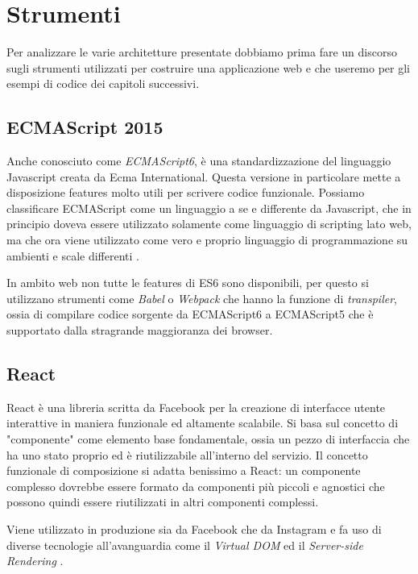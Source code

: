 \chapter{Strumenti}
Per analizzare le varie architetture presentate dobbiamo prima fare un discorso sugli strumenti utilizzati per costruire una applicazione web e che useremo per gli esempi di codice dei capitoli successivi.

\section{ECMAScript 2015}
Anche conosciuto come \textit{ECMAScript6}, è una standardizzazione del linguaggio Javascript creata da Ecma International. Questa versione in particolare mette a disposizione features molto utili per scrivere codice funzionale. Possiamo classificare ECMAScript come un linguaggio a se e differente da Javascript, che in principio doveva essere utilizzato solamente come linguaggio di scripting lato web, ma che ora viene utilizzato come vero e proprio linguaggio di programmazione su ambienti e scale differenti \cite{ECMAScriptDocumentation}.

In ambito web non tutte le features di ES6 sono disponibili, per questo si utilizzano strumenti come \textit{Babel} o \textit{Webpack} che hanno la funzione di \textit{transpiler}, ossia di compilare codice sorgente da ECMAScript6 a ECMAScript5 che è supportato dalla stragrande maggioranza dei browser.

\section{React}
React è una libreria scritta da Facebook per la creazione di interfacce utente interattive in maniera funzionale ed altamente scalabile. Si basa sul concetto di "componente" come elemento base fondamentale, ossia un pezzo di interfaccia che ha uno stato proprio ed è riutilizzabile all'interno del servizio. Il concetto funzionale di composizione si adatta benissimo a React: un componente complesso dovrebbe essere formato da componenti più piccoli e agnostici che possono quindi essere riutilizzati in altri componenti complessi.

Viene utilizzato in produzione sia da Facebook che da Instagram e fa uso di diverse tecnologie all'avanguardia come il \textit{Virtual DOM} ed il \textit{Server-side Rendering} \cite{WheelerOnReact}.

